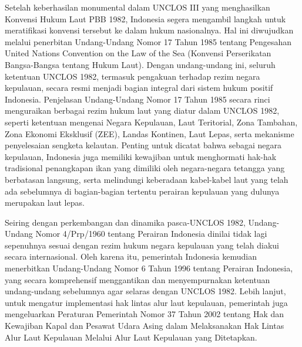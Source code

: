 \documentclass[12pt, a4paper]{article}
\begin{document}
Setelah keberhasilan monumental dalam UNCLOS III yang menghasilkan Konvensi Hukum Laut PBB 1982, Indonesia segera mengambil langkah untuk meratifikasi konvensi tersebut ke dalam hukum nasionalnya. Hal ini diwujudkan melalui penerbitan Undang-Undang Nomor 17 Tahun 1985 tentang Pengesahan United Nations Convention on the Law of the Sea (Konvensi Perserikatan Bangsa-Bangsa tentang Hukum Laut). Dengan undang-undang ini, seluruh ketentuan UNCLOS 1982, termasuk pengakuan terhadap rezim negara kepulauan, secara resmi menjadi bagian integral dari sistem hukum positif Indonesia. Penjelasan Undang-Undang Nomor 17 Tahun 1985 secara rinci menguraikan berbagai rezim hukum laut yang diatur dalam UNCLOS 1982, seperti ketentuan mengenai Negara Kepulauan, Laut Teritorial, Zona Tambahan, Zona Ekonomi Eksklusif (ZEE), Landas Kontinen, Laut Lepas, serta mekanisme penyelesaian sengketa kelautan. Penting untuk dicatat bahwa sebagai negara kepulauan, Indonesia juga memiliki kewajiban untuk menghormati hak-hak tradisional penangkapan ikan yang dimiliki oleh negara-negara tetangga yang berbatasan langsung, serta melindungi keberadaan kabel-kabel laut yang telah ada sebelumnya di bagian-bagian tertentu perairan kepulauan yang dulunya merupakan laut lepas.  

Seiring dengan perkembangan dan dinamika pasca-UNCLOS 1982, Undang-Undang Nomor 4/Prp/1960 tentang Perairan Indonesia dinilai tidak lagi sepenuhnya sesuai dengan rezim hukum negara kepulauan yang telah diakui secara internasional. Oleh karena itu, pemerintah Indonesia kemudian menerbitkan Undang-Undang Nomor 6 Tahun 1996 tentang Perairan Indonesia, yang secara komprehensif menggantikan dan menyempurnakan ketentuan undang-undang sebelumnya agar selaras dengan UNCLOS 1982. Lebih lanjut, untuk mengatur implementasi hak lintas alur laut kepulauan, pemerintah juga mengeluarkan Peraturan Pemerintah Nomor 37 Tahun 2002 tentang Hak dan Kewajiban Kapal dan Pesawat Udara Asing dalam Melaksanakan Hak Lintas Alur Laut Kepulauan Melalui Alur Laut Kepulauan yang Ditetapkan.  
\end{document}
